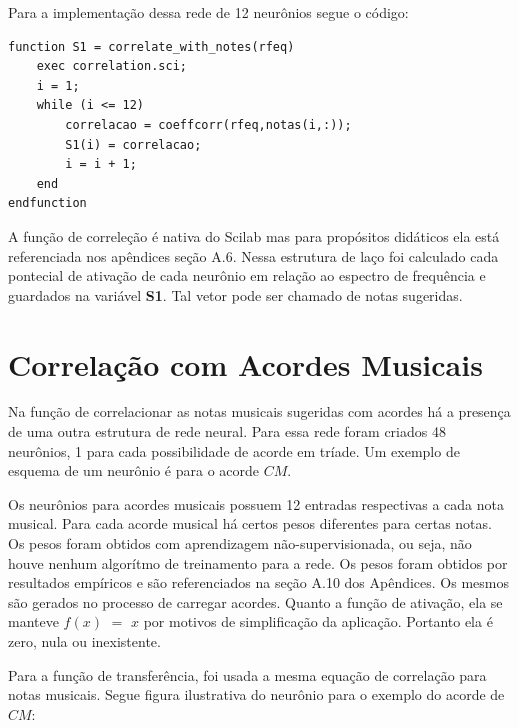 Para a implementação dessa rede de 12 neurônios segue o código:
\begin{lstlisting}
function S1 = correlate_with_notes(rfeq)
	exec correlation.sci;
	i = 1;
	while (i <= 12)
	    correlacao = coeffcorr(rfeq,notas(i,:));
	    S1(i) = correlacao;
	    i = i + 1;
	end
endfunction
\end{lstlisting}

A função de correleção é nativa do Scilab mas para propósitos didáticos ela está referenciada nos apêndices seção A.6. Nessa estrutura de laço foi calculado cada pontecial de ativação de cada neurônio em relação ao espectro de frequência e guardados na variável \textbf{S1}. Tal vetor pode ser chamado de notas sugeridas.

\section{Correlação com Acordes Musicais}
\label{sec:correlacaoacordes}

Na função de correlacionar as notas musicais sugeridas com acordes há a presença de uma outra estrutura de rede neural. Para essa rede foram criados 48 neurônios, 1 para cada possibilidade de acorde em tríade. Um exemplo de esquema de um neurônio é para o acorde $CM$.

Os neurônios para acordes musicais possuem 12 entradas respectivas a cada nota musical. Para cada acorde musical há certos pesos diferentes para certas notas. Os pesos foram obtidos com aprendizagem não-supervisionada, ou seja, não houve nenhum algorítmo de treinamento para a rede. Os pesos foram obtidos por resultados empíricos e são referenciados na seção A.10 dos Apêndices. Os mesmos são gerados no processo de carregar acordes. Quanto a função de ativação, ela se manteve $f(x)$ $=$ $x$ por motivos de simplificação da aplicação. Portanto ela é zero, nula ou inexistente.

Para a função de transferência, foi usada a mesma equação de correlação para notas musicais. Segue figura ilustrativa do neurônio para o exemplo do acorde de $CM$:

